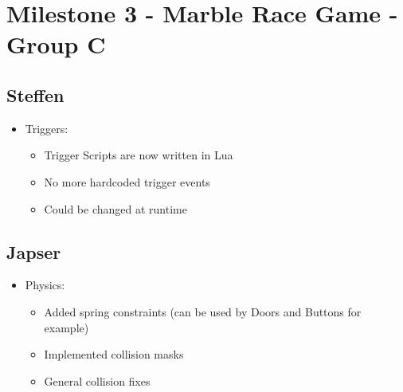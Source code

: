 \documentclass{beamer}
\title{\myTitle}
\author{\myAutors}
\institute{RWTH Aachen University}
\date{\today}
\newcommand{\myTitle}{Milestone 3 - Marble Race Game - Group C}
\begin{document}
\begin{frame}
    \titlepage
\end{frame}

\section{\myTitle}

\subsection{Steffen}

\begin{frame}
    \begin{itemize}
    \item Triggers:
    \begin{itemize}
        \item Trigger Scripts are now written in Lua
        \item No more hardcoded trigger events
        \item Could be changed at runtime
    \end{itemize}
    \end{itemize}
\end{frame}

\subsection{Japser}

\begin{frame}
    \begin{itemize}
    \item Physics:
    \begin{itemize}
        \item Added spring constraints (can be used by Doors and Buttons for example)
        \item Implemented collision masks
        \item General collision fixes
    \end{itemize}
    \end{itemize}
\end{frame}
\end{document}
